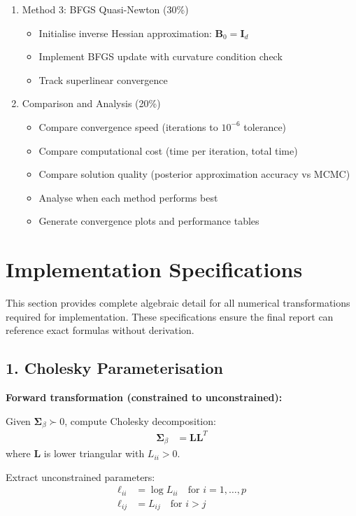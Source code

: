 \documentclass[11pt]{article}
\begin{document}
\begin{enumerate}[leftmargin=*]
\item Method 3: BFGS Quasi-Newton (30\%)
\begin{itemize}
\item Initialise inverse Hessian approximation: $\bm{B}_0 = \bm{I}_d$ 
\item Implement BFGS update with curvature condition check
\item Track superlinear convergence
\end{itemize}

\item Comparison and Analysis (20\%)
\begin{itemize}
\item Compare convergence speed (iterations to $10^{-6}$ tolerance)
\item Compare computational cost (time per iteration, total time)
\item Compare solution quality (posterior approximation accuracy vs MCMC)
\item Analyse when each method performs best
\item Generate convergence plots and performance tables
\end{itemize}
\end{enumerate}

\newpage
\section*{Implementation Specifications}

This section provides complete algebraic detail for all numerical transformations required for implementation. These specifications ensure the final report can reference exact formulas without derivation.

\subsection*{1. Cholesky Parameterisation}

\textbf{Forward transformation (constrained to unconstrained):}

Given $\bm{\Sigma}_\beta \succ 0$, compute Cholesky decomposition:
\begin{align}
\bm{\Sigma}_\beta &= \bm{L}\bm{L}^T
\end{align}
where $\bm{L}$ is lower triangular with $L_{ii} > 0$.

Extract unconstrained parameters:
\begin{align}
\ell_{ii} &= \log L_{ii} \quad \text{for } i=1,\ldots,p\\
\ell_{ij} &= L_{ij} \quad \text{for } i > j
\end{align}
\end{document}
